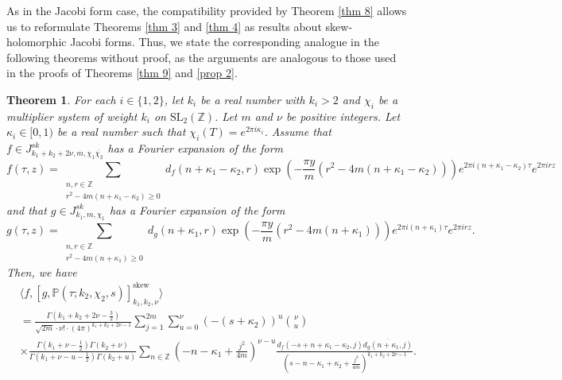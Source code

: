 \documentclass[11pt]{amsart}
\newtheorem{thm}{Theorem}[section]
\theoremstyle{definition}
\theoremstyle{remark}
\numberwithin{equation}{section}
\renewcommand{\(}{\left(}
\renewcommand{\)}{\right)}
\begin{document}
As in the Jacobi form case, the compatibility provided by Theorem \ref{thm 8} allows us to reformulate Theorems \ref{thm 3} and \ref{thm 4} as results about skew‐holomorphic Jacobi forms. 
Thus, we state the corresponding analogue in the following theorems without proof, as the arguments are analogous to those used in the proofs of Theorems \ref{thm 9} and \ref{prop 2}.


\begin{thm}\label{thm 10}
    For each $i\in \{1,2\}$, let $k_i$ be a real number with $k_i>2$ and $\chi_i$ be a multiplier system of weight $k_i$ on $\mathrm{SL}_{2}(\mathbb{Z})$. 
    Let $m$ and $\nu$ be positive integers. 
    Let $\kappa_i\in [0,1)$ be a real number such that $\chi_{i}(T)=e^{2\pi i \kappa_i}$.
    Assume that $f\in J^{sk}_{k_1+k_2+2\nu,m,\chi_1\overline{\chi_2}}$ has a Fourier expansion of the form
    \[ f(\tau,z)=\sum_{\substack{n,r\in \mathbb{Z}\\r^2-4m(n+\kappa_1-\kappa_2)\geq 0}} d_{f}(n+\kappa_1-\kappa_2,r)\exp\left(-\frac{\pi y}{m}(r^2-4m(n+\kappa_1-\kappa_2))\right)e^{2\pi i (n+\kappa_1-\kappa_2)\tau}e^{2\pi i r z} \]
    and that $g\in J^{sk}_{k_1,m,\chi_1}$ has a Fourier expansion of the form
    \[ g(\tau,z)=\sum_{\substack{n,r\in \mathbb{Z}\\r^2-4m(n+\kappa_1)\geq 0}} d_{g}(n+\kappa_1,r)\exp\left(-\frac{\pi y}{m}(r^2-4m(n+\kappa_1))\right) e^{2\pi i (n+\kappa_1)\tau}e^{2\pi i r z}. \]
    Then, we have 
    \begin{equation*}
        \begin{aligned}
            &\langle f, [g,\mathbb{P}(\tau;k_2,\chi_2,s)]_{k_1,k_2,\nu}^{\mathrm{skew}} \rangle\\
            &=\frac{\Gamma(k_1+k_2+2\nu-\frac{3}{2})}{\sqrt{2m}\cdot \nu!\cdot (4\pi)^{k_1+k_2+2\nu-1}}\sum_{j=1}^{2m}\sum_{u=0}^{\nu} (-(s+\kappa_{2}))^{u}\binom{\nu}{u}\\
            &\times\frac{\Gamma(k_1+\nu-\frac{1}{2})\Gamma(k_2+\nu)}{\Gamma(k_1+\nu-u-\frac{1}{2})\Gamma(k_2+u)}\sum_{n\in \mathbb{Z}} \left(-n-\kappa_{1}+\frac{j^2}{4m}\right)^{\nu-u}\frac{d_{f}(-s+n+\kappa_{1}-\kappa_{2},j)\overline{d_g(n+\kappa_{1},j)}}{\left(s-n-\kappa_{1}+\kappa_{2}+\frac{j^2}{4m}\right)^{k_1+k_2+2\nu-1}}.
        \end{aligned}
    \end{equation*}
\end{thm}
\end{document}
